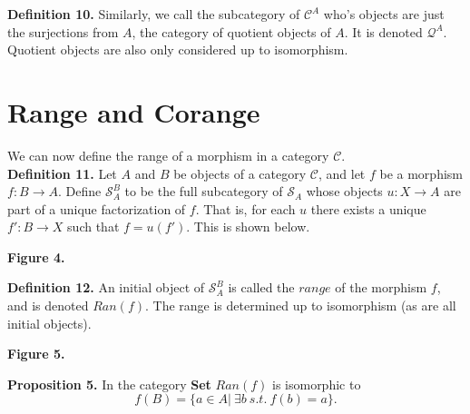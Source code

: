 \documentclass{article}
\theoremstyle{problemstyle}
\begin{document}
\textbf{Definition 10.} Similarly, we call the subcategory of $\mathcal{C}^A$ who's objects are just the surjections from $A$, the category of quotient objects of $A$. It is denoted $\mathcal{Q}^A$. Quotient objects are also only considered up to isomorphism. 

\section{Range and Corange}

We can now define the range of a morphism in a category $\mathcal{C}$.\\

\textbf{Definition 11.} Let $A$ and $B$ be objects of a category $\mathcal{C}$, and let $f$ be a morphism $f:B \rightarrow A$. Define $\mathcal{S}^B_A$ to be the full subcategory of $\mathcal{S}_A$
whose objects $u:X\rightarrow A$ are part of a unique factorization of $f$. That is, for each $u$ there exists a unique $f':B \rightarrow X$ such that $f =u(f')$. This is shown below.  

\begin{center}
\end{center}
\begin{center}
\textbf{Figure 4.}
\end{center}

\textbf{Definition 12.} An initial object of $\mathcal{S}^B_A$ is called the $range$ of the morphism $f$, and is denoted $Ran(f)$. The range is determined up to isomorphism (as are all initial objects).  

\begin{center}
\end{center}
\begin{center}
\textbf{Figure 5.}
\end{center} 

\textbf{Proposition 5.} In the category  \textbf{Set} $Ran(f)$ is isomorphic to $$f(B) = \{a \in A| \ \exists b \ s.t.\ f(b) = a\}.$$
\end{document}
